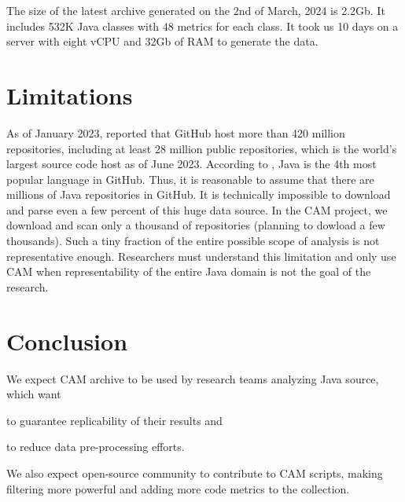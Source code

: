 \documentclass[11pt,sigplan,nonacm]{acmart}
\newcommand\cam{{\sffamily CAM}}
\begin{document}
The size of the latest archive generated on the 2nd of March, 2024 is 2.2Gb. It includes 532K Java classes with 48 metrics for each class. It took us 10 days on a server with eight vCPU and 32Gb of RAM to generate the data.

\section{Limitations}

As of January 2023, \citet{dohmke2023} reported that GitHub host more than 420 million repositories, including at least 28 million public repositories, which is the world's largest source code host as of June 2023. According to \citep{daigle2023}, Java is the 4th most popular language in GitHub. Thus, it is reasonable to assume that there are millions of Java repositories in GitHub. It is technically impossible to download and parse even a few percent of this huge data source. In the \cam{} project, we download and scan only a thousand of repositories (planning to dowload a few thousands). Such a tiny fraction of the entire possible scope of analysis is not representative enough. Researchers must understand this limitation and only use \cam{} when representability of the entire Java domain is not the goal of the research.

\section{Conclusion}

We expect CAM archive to be used by research teams analyzing Java source, which want
\begin{inparaenum}[(a)]
\item to guarantee replicability of their results
and
\item to reduce data pre-processing efforts.
\end{inparaenum}
We also expect open-source community to contribute to CAM scripts, making filtering more powerful and adding more code metrics to the collection.



\end{document}
